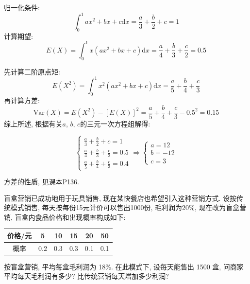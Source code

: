 \documentclass[standard]{ExBook}
\begin{document}
\begin{qitems}
\begin{bbox}
归一化条件:
$$\int_{0}^{1}ax^2+bx+c\mathrm{d}x=\frac{a}{3}+\frac{b}{2}+c=1$$
计算期望:
$$E(X)=\int_{0}^{1}x(ax^2+bx+c)\mathrm{d}x=\frac{a}{4}+\frac{b}{3}+\frac{c}{2}=0.5$$
    \end{bbox}

\vspace{-5em}

    \begin{bbox}
先计算二阶原点矩:
$$E(X^2)=\int_{0}^{1}x^2(ax^2+bx+c)\mathrm{d}x=\frac{a}{5}+\frac{b}{4}+\frac{c}{3}$$
再计算方差:
$$\mathrm{Var}(X)=E(X^2)-\left[E(X)\right]^2=\frac{a}{5}+\frac{b}{4}+\frac{c}{3}-0.5^2=0.15$$
综上所述, 根据有关$a$, $b$, $c$的三元一次方程组解得:
\vspace{-2em}
\begin{center}
\begin{equation}
    \left\{
\begin{array}{l}
    \nonumber
    \frac{a}{3}+\frac{b}{2}+c=1\\
    \frac{a}{4}+\frac{b}{3}+\frac{c}{2}=0.5\\
    \frac{a}{5}+\frac{b}{4}+\frac{c}{3}=0.4
\end{array}
    \right.
    \Longrightarrow
    \left\{
\begin{array}{l}
    \nonumber
    a=12\\
    b=-12\\
    c=3
\end{array}
    \right.
\end{equation}
\end{center}
\textcolor{themeColor}{\selectfont {}
方差的性质, 见课本P136.}
    \end{bbox}

\vspace{-5em}

    \begin{bbox}
    \begin{shaded}
        \qitem
盲盒营销已成功地用于玩具销售, 现在某快餐店也希望引入这种营销方式. 设按传统模式销售, 每天按每份15元计价可以售出1000份, 毛利润为20\%, 现在改为盲盒营销, 盲盒内食品价格和出现概率构成如下:
\begin{center}
\setlength{\tabcolsep}{31pt}
\begin{tabular}{c|ccccc}
    \hline
    价格/元 & 5 & 10 & 15 & 20 & 50\\
    \hline
    概率 & 0.2 & 0.3 & 0.3 & 0.1 & 0.1\\
    \hline
\end{tabular}
\end{center}
按盲盒营销, 平均每盒毛利润为 18\%. 在此模式下, 设每天能售出 1500 盒, 问商家平均每天毛利润有多少? 比传统营销每天增加多少利润?
    \end{shaded}
    \end{bbox}


\end{qitems}
\end{document}
